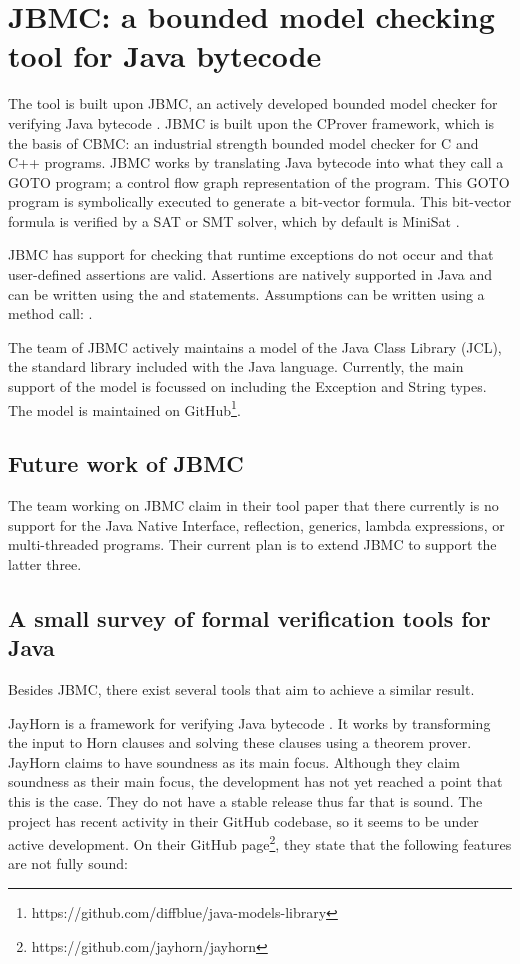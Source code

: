 \chapter{JBMC: a bounded model checking tool for Java bytecode} \label{chap:jbmc}
The tool is built upon JBMC, an actively developed bounded model checker for 
verifying Java bytecode \cite{ckkst2018}. JBMC is built upon the CProver framework,
which is the basis of CBMC: an industrial strength bounded model checker for C 
and C++ programs. JBMC works by translating Java bytecode into what they call a
GOTO program; a control flow graph representation of the program. This GOTO 
program is symbolically executed to generate a bit-vector formula. This bit-vector
formula is verified by a SAT or SMT solver, which by default is MiniSat 
\cite{een2003extensible}.

JBMC has support for checking that runtime exceptions do not occur and that 
user-defined assertions are valid. Assertions are natively supported in Java 
and can be written using the  and  
statements. Assumptions can be written using a method call: .

The team of JBMC actively maintains a model of the Java Class Library (JCL), 
the standard library included with the Java language. Currently, the main support
of the model is focussed on including the Exception and String types. The model
is maintained on GitHub\footnote{https://github.com/diffblue/java-models-library}.

\section{Future work of JBMC}
The team working on JBMC claim in their tool paper \cite{ckkst2018} that there
currently is no support for the Java Native Interface, reflection, generics, 
lambda expressions, or multi-threaded programs. Their current plan is to extend 
JBMC to support the latter three.

\section{A small survey of formal verification tools for Java}
Besides JBMC, there exist several tools that aim to achieve a similar result.

JayHorn is a framework for verifying Java bytecode \cite{kahsai2016jayhorn}. It 
works by transforming the input to Horn clauses and solving these clauses using 
a theorem prover. JayHorn claims to have soundness as its main focus. Although 
they claim soundness as their main focus, the development has not yet reached a
point that this is the case. They do not have a stable release thus far that is
sound. The project has recent activity in their GitHub codebase, so it seems to
be under active development. On their GitHub 
page\footnote{https://github.com/jayhorn/jayhorn}, they state that the following
features are not fully sound:

